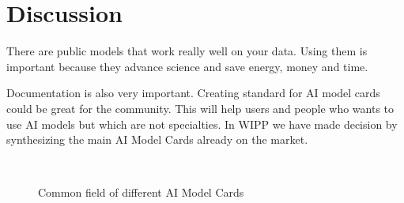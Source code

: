 \section{Discussion}
\label{sec:discussion}

There are public models that work really well on your data. Using them is
important because they advance science and save energy, money and time.

Documentation is also very important. Creating standard for AI model cards could
be great for the community. This will help users and people who wants to use AI
models but which are not specialties. In WIPP we have made decision by
synthesizing the main AI Model Cards already on the market.

\TODO\

\def\firstellip{(1.6, 0) ellipse [x radius=2.7cm, y radius=1.5cm, rotate=50]}
\def\secondellip{(0.3, 1cm) ellipse [x radius=2.7cm, y radius=1.5cm, rotate=50]}
\def\thirdellip{(-1.6, 0) ellipse [x radius=2.7cm, y radius=1.5cm, rotate=-50]}
\def\fourthellip{(-0.3, 1cm) ellipse [x radius=2.7cm, y radius=1.5cm, rotate=-50]}

\begin{figure}[H]
\centering
{}
\caption{Common field of different AI Model Cards} \label{fig:venn}
\end{figure}

